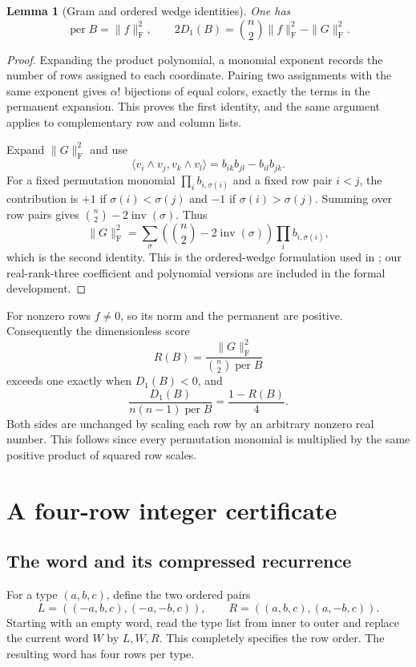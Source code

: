 \documentclass[11pt]{article}
\newtheorem{lemma}[theorem]{Lemma}
\theoremstyle{remark}\newtheorem{remark}[theorem]{Remark}
\newcommand{\per}{\operatorname{per}}
\newcommand{\inv}{\operatorname{inv}}
\newcommand{\F}{\mathrm F}
\begin{document}
\begin{lemma}[Gram and ordered wedge identities]\label{lem:endpoint}
One has
\[
 \per B=\|f\|_{\F}^2,
 \qquad
 2D_1(B)=\binom n2\|f\|_{\F}^2-\|G\|_{\F}^2.
\]
\end{lemma}
\begin{proof}
Expanding the product polynomial, a monomial exponent records the number
of rows assigned to each coordinate. Pairing two assignments with the
same exponent gives $\alpha!$ bijections of equal colors, exactly the
terms in the permanent expansion. This proves the first identity,
and the same argument applies to complementary row and column lists.

Expand $\|G\|_{\F}^2$ and use
\[
 \langle v_i\wedge v_j,v_k\wedge v_l\rangle
   =b_{ik}b_{jl}-b_{il}b_{jk}.
\]
For a fixed permutation monomial $\prod_i b_{i,\sigma(i)}$ and a fixed
row pair $i<j$, the contribution is $+1$ if
$\sigma(i)<\sigma(j)$ and $-1$ if $\sigma(i)>\sigma(j)$.
Summing over row pairs gives $\binom n2-2\inv(\sigma)$.
Thus
\[
 \|G\|_{\F}^2
 =\sum_\sigma\left(\binom n2-2\inv(\sigma)\right)
                         \prod_i b_{i,\sigma(i)},
\]
which is the second identity. This is the ordered-wedge formulation
used in \cite{Kitamura2026}; our real-rank-three coefficient and
polynomial versions are included in the formal development.
\end{proof}

For nonzero rows $f\ne0$, so its norm and the permanent are positive.
Consequently the dimensionless score
\[
 R(B)=\frac{\|G\|_{\F}^2}{\binom n2\per B}
\]
exceeds one exactly when $D_1(B)<0$, and
\begin{equation}\label{eq:normalized}
 \frac{D_1(B)}{n(n-1)\per B}=\frac{1-R(B)}4.
\end{equation}
Both sides are unchanged by scaling each row by an arbitrary nonzero
real number. This follows since every permutation monomial is
multiplied by the same positive product of squared row scales.

\section{A four-row integer certificate}\label{sec:certificate}

\subsection{The word and its compressed recurrence}

For a type $(a,b,c)$, define the two ordered pairs
\[
 L=((-a,b,c),(-a,-b,c)),\qquad
 R=((a,b,c),(a,-b,c)).
\]
Starting with an empty word, read the type list from inner to outer and
replace the current word $W$ by $L,W,R$. This completely specifies the
row order. The resulting word has four rows per type.
\end{document}
